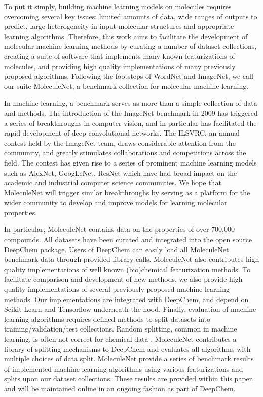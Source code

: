 To put it simply, building machine learning models on molecules requires overcoming several key issues: limited amounts of data, wide ranges of outputs to predict, large heterogeneity in input molecular structures and appropriate learning algorithms. Therefore, this work aims to facilitate the development of molecular machine learning methods by curating a number of dataset collections, creating a suite of software that implements many known featurizations of molecules, and providing high quality implementations of many previously proposed algorithms. Following the footsteps of WordNet\cite{wordnet} and ImageNet\cite{imagenet_cvpr09}, we call our suite MoleculeNet, a benchmark collection for molecular machine learning.

In machine learning, a benchmark serves as more than a simple collection of data and methods. The introduction of the ImageNet benchmark in 2009 has triggered a series of breakthroughs in computer vision, and in particular has facilitated the rapid development of deep convolutional networks. The ILSVRC, an annual contest held by the ImageNet team\cite{ILSVRC15}, draws considerable attention from the community, and greatly stimulates collaborations and competitions across the field. The contest has given rise to a series of prominent machine learning models such as AlexNet\cite{alexnet}, GoogLeNet\cite{googlenet}, ResNet\cite{resnet} which have had broad impact on the academic and industrial computer science communities. We hope that MoleculeNet will trigger similar breakthroughs by serving as a platform for the wider community to develop and improve models for learning molecular properties.

In particular, MoleculeNet contains data on the properties of over 700,000 compounds. All datasets have been curated and integrated into the open source DeepChem package.\cite{deepchem} Users of DeepChem can easily load all MoleculeNet benchmark data through provided library calls. MoleculeNet also contributes high quality implementations of well known (bio)chemical featurization methods. To facilitate comparison and development of new methods, we also provide high quality implementations of several previously proposed machine learning methods. Our implementations are integrated with DeepChem, and depend on Scikit-Learn \cite{pedregosa2011scikit} and Tensorflow \cite{abadi2016tensorflow} underneath the hood. Finally, evaluation of machine learning algorithms requires defined methods to split datasets into training/validation/test collections. Random splitting, common in machine learning, is often not correct for chemical data \cite{sheridan2013time}. MoleculeNet contributes a library of splitting mechanisms to DeepChem and evaluates all algorithms with multiple choices of data split. MoleculeNet provide a series of benchmark results of implemented machine learning algorithms using various featurizations and splits upon our dataset collections. These results are provided within this paper, and will be maintained online in an ongoing fashion as part of DeepChem. 


